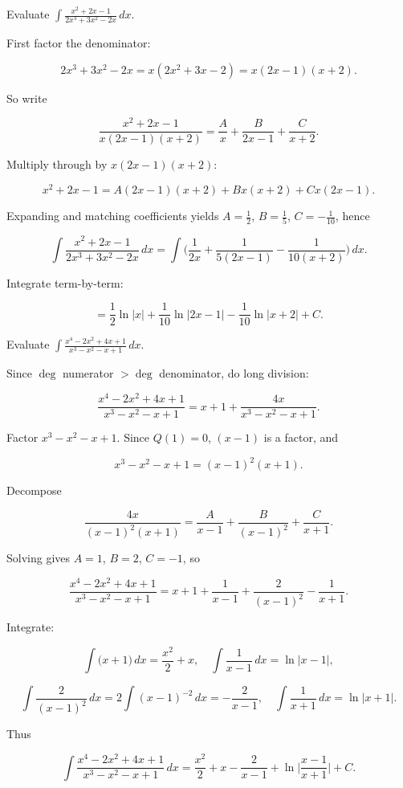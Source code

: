 \begin{examplebox}[title={Worked Example: Proper rational function (linear factors)}]

Evaluate $\displaystyle \int \frac{x^{2}+2x-1}{2x^{3}+3x^{2}-2x}\,dx$.

First factor the denominator:

\[
2x^{3}+3x^{2}-2x=x(2x^{2}+3x-2)=x(2x-1)(x+2).
\]

So write

\[
\frac{x^{2}+2x-1}{x(2x-1)(x+2)}=\frac{A}{x}+\frac{B}{2x-1}+\frac{C}{x+2}.
\]

Multiply through by $x(2x-1)(x+2)$:

\[
x^{2}+2x-1 = A(2x-1)(x+2)+Bx(x+2)+Cx(2x-1).
\]

Expanding and matching coefficients yields $A=\frac12$, $B=\frac15$, $C=-\frac{1}{10}$, hence

\[
\int \frac{x^{2}+2x-1}{2x^{3}+3x^{2}-2x}\,dx
=\int\Big(\frac{1}{2x}+\frac{1}{5(2x-1)}-\frac{1}{10(x+2)}\Big)\,dx.
\]

Integrate term-by-term:

\[
=\frac12\ln|x|+\frac{1}{10}\ln|2x-1|-\frac{1}{10}\ln|x+2|+C.
\]

\end{examplebox}

\begin{examplebox}[title={Worked Example: Improper rational function (long division first)}]

Evaluate $\displaystyle \int \frac{x^{4}-2x^{2}+4x+1}{x^{3}-x^{2}-x+1}\,dx$.

Since $\deg$ numerator $>\deg$ denominator, do long division:

\[
\frac{x^{4}-2x^{2}+4x+1}{x^{3}-x^{2}-x+1}
= x+1+\frac{4x}{x^{3}-x^{2}-x+1}.
\]

Factor $x^{3}-x^{2}-x+1$. Since $Q(1)=0$, $(x-1)$ is a factor, and

\[
x^{3}-x^{2}-x+1=(x-1)^{2}(x+1).
\]

Decompose

\[
\frac{4x}{(x-1)^{2}(x+1)}=\frac{A}{x-1}+\frac{B}{(x-1)^{2}}+\frac{C}{x+1}.
\]

Solving gives $A=1$, $B=2$, $C=-1$, so

\[
\frac{x^{4}-2x^{2}+4x+1}{x^{3}-x^{2}-x+1}
= x+1+\frac{1}{x-1}+\frac{2}{(x-1)^{2}}-\frac{1}{x+1}.
\]

Integrate:

\[
\int \Big(x+1\Big)\,dx=\frac{x^{2}}{2}+x,\quad
\int \frac{1}{x-1}\,dx=\ln|x-1|,
\]

\[
\int \frac{2}{(x-1)^{2}}\,dx = 2\int (x-1)^{-2}\,dx = -\frac{2}{x-1},\quad
\int \frac{1}{x+1}\,dx=\ln|x+1|.
\]

Thus

\[
\int \frac{x^{4}-2x^{2}+4x+1}{x^{3}-x^{2}-x+1}\,dx
=\frac{x^{2}}{2}+x-\frac{2}{x-1}+\ln\Big|\frac{x-1}{x+1}\Big|+C.
\]

\end{examplebox}

